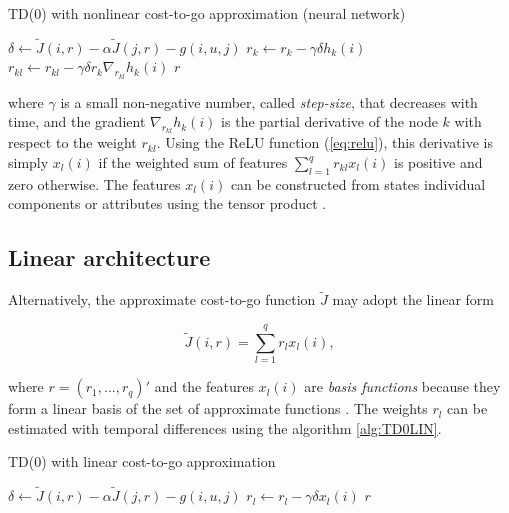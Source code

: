 \begin{algorithm}
\caption{TD(0) with nonlinear cost-to-go approximation (neural network)}
\label{alg:TD0NN}
\begin{algorithmic}[1]
\State $\delta \gets \tilde{J}(i,r) - \alpha \tilde{J}(j,r) - g(i,u,j)$
\State $r_k \gets r_k - \gamma \delta h_k(i)$
\State $r_{kl} \gets r_{kl} - \gamma \delta r_k \nabla_{r_{kl}}  h_k(i)$
\State \Return $r$
\end{algorithmic}
\end{algorithm}

\noindent where $\gamma$ is a small non-negative number, called \emph{step-size}, that decreases with time, and the gradient $\nabla_{r_{kl}}  h_k(i)$ is the partial derivative of the node $k$ with respect to the weight $r_{kl}$. Using the ReLU function (\ref{eq:relu}), this derivative is simply $x_l(i)$ if the weighted sum of features $\sum_{l=1}^{q}{r_{kl}} x_l(i)$ is positive and zero otherwise. The features $x_l(i)$ can be constructed from states individual components or attributes using the tensor product \citep[section 2.2]{Szepesvari2010}.


\subsection{Linear architecture}
\label{sec:LSTD}

Alternatively, the approximate cost-to-go function $\tilde{J}$ may adopt the linear form

\begin{equation}
\label{eq:linarch}
\tilde{J}(i,r) = \sum_{l=1}^{q}{r_l x_l(i)},
\end{equation}

\noindent where $r = (r_1, \dots, r_q)'$ and the features $x_l(i)$ are \emph{basis functions} because they form a linear basis of the set of approximate functions \citep[section 9.4]{Sutton2018}. The weights $r_l$ can be estimated with temporal differences using the algorithm \ref{alg:TD0LIN}.

\begin{algorithm}
\caption{TD(0) with linear cost-to-go approximation}
\label{alg:TD0LIN}
\begin{algorithmic}[1]
\State $\delta \gets \tilde{J}(i,r) - \alpha \tilde{J}(j,r) - g(i,u,j)$
\State $r_l \gets r_l - \gamma \delta x_l(i)$
\State \Return $r$
\end{algorithmic}
\end{algorithm}




